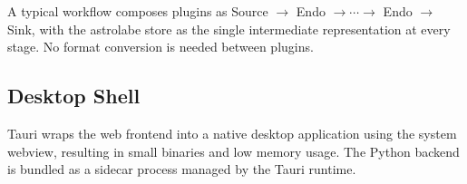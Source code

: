 A typical workflow composes plugins as Source $\to$ Endo $\to \cdots \to$ Endo $\to$ Sink, with the astrolabe store as the single intermediate representation at every stage. No format conversion is needed between plugins.

\subsection{Desktop Shell}

Tauri wraps the web frontend into a native desktop application using the system webview, resulting in small binaries and low memory usage. The Python backend is bundled as a sidecar process managed by the Tauri runtime.
